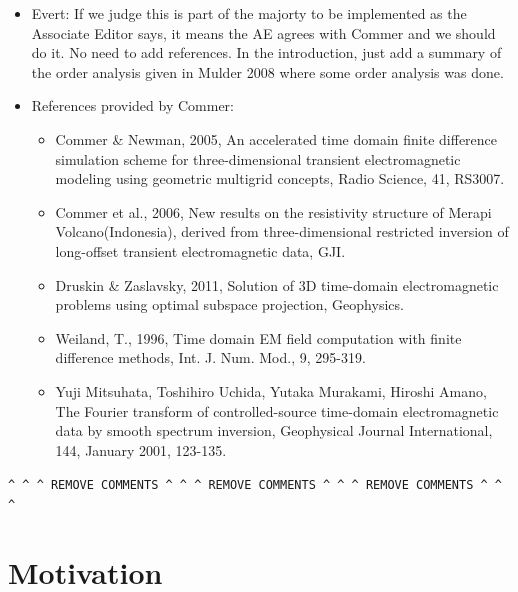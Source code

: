 \documentclass[onecolumn,extra,referee,camera]{gji}
\begin{document}
{\begin{itemize}
    which options they prefer. We should not be forced need to sell our method.
    Of course, my personal opinion does not change the reality that the AE has
    written that he wants to see the majority of the reviewers comments
    implemented in our revision. We should accept that.
  \item Evert: If we judge this is part of the majorty to be implemented as the
    Associate Editor says, it means the AE agrees with Commer and we should do
    it. No need to add references. In the introduction, just add a summary of
    the order analysis given in Mulder 2008 where some order analysis was
    done.
  \item References provided by Commer:
    \begin{itemize}
      \item Commer \& Newman, 2005, An accelerated time domain finite
        difference simulation scheme for three-dimensional transient
        electromagnetic modeling using geometric multigrid concepts, Radio
        Science, 41, RS3007.
      \item Commer et al., 2006, New results on the resistivity structure of
        Merapi Volcano(Indonesia), derived from three-dimensional restricted
        inversion of long-offset transient electromagnetic data, GJI.
      \item Druskin \& Zaslavsky, 2011, Solution of 3D time-domain
        electromagnetic problems using optimal subspace projection,
        Geophysics.
      \item Weiland, T., 1996, Time domain EM field computation with finite
        difference methods, Int. J. Num. Mod., 9, 295-319.
      \item Yuji Mitsuhata, Toshihiro Uchida, Yutaka Murakami, Hiroshi Amano,
        The Fourier transform of controlled-source time-domain electromagnetic
        data by smooth spectrum inversion, Geophysical Journal International,
        144, January 2001, 123-135.
    \end{itemize}
\end{itemize}

}
{\color{alizarin}
\verb!^ ^ ^ REMOVE COMMENTS ^ ^ ^ REMOVE COMMENTS ^ ^ ^ REMOVE COMMENTS ^ ^ ^!
}


\section{Motivation}  %
\end{document}
